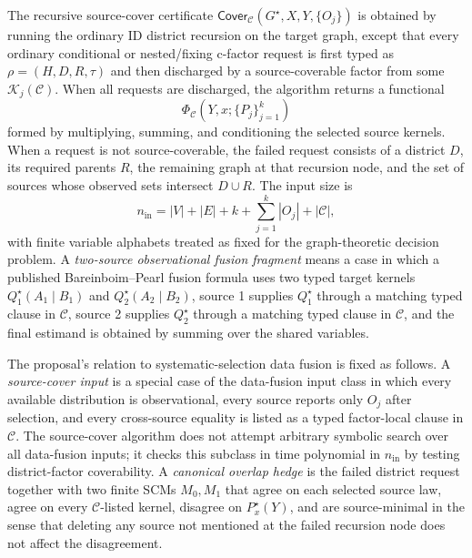 \documentclass[11pt]{article}
\theoremstyle{definition}
\theoremstyle{plain}
\theoremstyle{remark}
\begin{document}
The recursive source-cover certificate
\(\mathsf{Cover}_{\mathcal C}(G^\star,X,Y,\{O_j\})\) is obtained by running
the ordinary ID district recursion on the target graph, except that every
ordinary conditional or nested/fixing c-factor request is first typed as
\(\rho=(H,D,R,\tau)\) and then discharged by a source-coverable factor from
some \(\mathcal K_j(\mathcal C)\).  When all
requests are discharged, the algorithm returns a functional
\[
  \Phi_{\mathcal C}(Y,x;\{P_j\}_{j=1}^k)
\]
formed by multiplying, summing, and conditioning the selected source kernels.
When a request is not source-coverable, the failed request consists of a
district \(D\), its required parents \(R\), the remaining graph at that
recursion node, and the set of sources whose observed sets intersect
\(D\cup R\).
The input size is
\[
  n_{\mathrm{in}}=|V|+|E|+k+\sum_{j=1}^k |O_j|+|\mathcal C|,
\]
with finite variable alphabets treated as fixed for the graph-theoretic
decision problem.  A \emph{two-source observational fusion fragment} means a
case in which a published Bareinboim--Pearl fusion formula uses two typed
target kernels \(Q_1^\star(A_1\mid B_1)\) and \(Q_2^\star(A_2\mid B_2)\),
source 1 supplies \(Q_1^\star\) through a matching typed clause in
\(\mathcal C\), source 2 supplies \(Q_2^\star\) through a matching typed
clause in \(\mathcal C\), and the final estimand is obtained by summing over
the shared variables.

The proposal's relation to systematic-selection data fusion is fixed as
follows.  A \emph{source-cover input} is a special case of the data-fusion
input class in which every available distribution is observational, every
source reports only \(O_j\) after selection, and every cross-source equality is
listed as a typed factor-local clause in \(\mathcal C\).  The source-cover algorithm
does not attempt arbitrary symbolic search over all data-fusion inputs; it
checks this subclass in time polynomial in \(n_{\mathrm{in}}\) by testing
district-factor coverability.  A \emph{canonical overlap hedge} is the failed
district request together with two finite SCMs \(M_0,M_1\) that agree on each
selected source law, agree on every \(\mathcal C\)-listed kernel, disagree on
\(P^\star_x(Y)\), and are source-minimal in the sense that deleting any source
not mentioned at the failed recursion node does not affect the disagreement.
\end{document}
